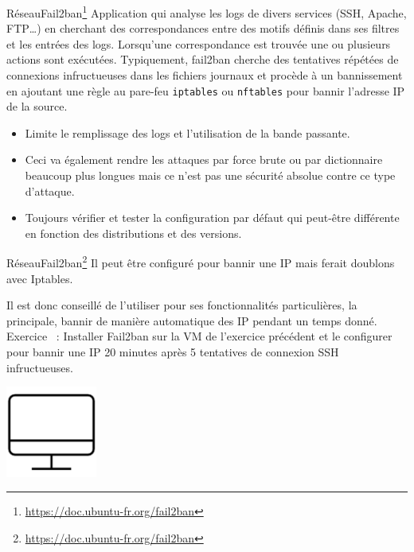 \documentclass{beamer}
\begin{document}
    \begin{frame}{Réseau}{Fail2ban\footnote{\url{https://doc.ubuntu-fr.org/fail2ban}}}
        Application qui analyse les logs de divers services (SSH, Apache, FTP…) en cherchant des correspondances entre des motifs définis dans ses filtres et les entrées des logs.
        Lorsqu'une correspondance est trouvée une ou plusieurs actions sont exécutées.
        Typiquement, fail2ban cherche des tentatives répétées de connexions infructueuses dans les fichiers journaux et procède à un bannissement en ajoutant une règle au pare-feu \lstinline{iptables} ou \lstinline{nftables} pour bannir l'adresse IP de la source.
        \begin{dangercolorbox}
            \begin{itemize}
                \item Limite le remplissage des logs et l'utilisation de la bande passante.
                \item Ceci va également rendre les attaques par force brute ou par dictionnaire beaucoup plus longues mais ce n'est pas une sécurité absolue contre ce type d'attaque.
                \item Toujours vérifier et tester la configuration par défaut qui peut-être différente en fonction des distributions et des versions.
            \end{itemize}
        \end{dangercolorbox}
    \end{frame}

    \begin{frame}{Réseau}{Fail2ban\footnote{\url{https://doc.ubuntu-fr.org/fail2ban}}}
        Il peut être configuré pour bannir une IP mais ferait doublons avec Iptables.

        Il est donc conseillé de l'utiliser pour ses fonctionnalités particulières, la principale, bannir de manière automatique des IP pendant un temps donné.
        \bigbreak
        Exercice \execcounterdispinc{}~:
        Installer Fail2ban sur la VM de l'exercice précédent et le configurer pour bannir une IP 20 minutes après 5 tentatives de connexion SSH infructueuses.
        \begin{center}
            \includegraphics[width=3cm]{image/desktop}
        \end{center}
    \end{frame}
\end{document}
